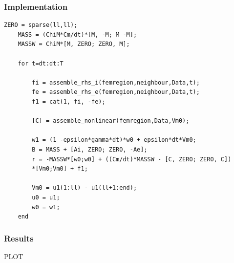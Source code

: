 \documentclass[a4paper,12pt]{article}
\begin{document}
\subsubsection{Implementation}
\begin{verbatim}
ZERO = sparse(ll,ll);
    MASS = (ChiM*Cm/dt)*[M, -M; M -M];
    MASSW = ChiM*[M, ZERO; ZERO, M];
    
    for t=dt:dt:T
        
        fi = assemble_rhs_i(femregion,neighbour,Data,t);
        fe = assemble_rhs_e(femregion,neighbour,Data,t);
        f1 = cat(1, fi, -fe);
    
        [C] = assemble_nonlinear(femregion,Data,Vm0);
        
        w1 = (1 -epsilon*gamma*dt)*w0 + epsilon*dt*Vm0;
        B = MASS + [Ai, ZERO; ZERO, -Ae];
        r = -MASSW*[w0;w0] + ((Cm/dt)*MASSW - [C, ZERO; ZERO, C])
        *[Vm0;Vm0] + f1;
 
        Vm0 = u1(1:ll) - u1(ll+1:end);
        u0 = u1;
        w0 = w1;
    end
    \end{verbatim}
    \subsubsection{Results}
    PLOT
    \newpage
    \printbibliography
\end{document}
